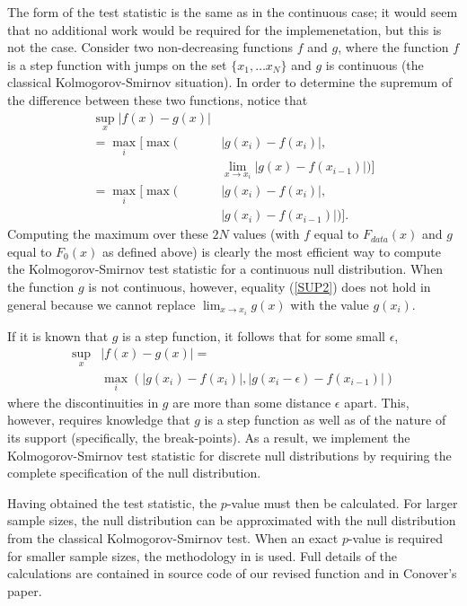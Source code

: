 The form of the test statistic is the same as in the
continuous case; it would seem that no additional work would be required
for the implemenetation, but this is not the case.
Consider two non-decreasing functions $f$ and $g$, where the function $f$ is a step function with jumps on the set $\{x_1, \ldots x_N \}$ and $g$
is continuous (the classical Kolmogorov-Smirnov situation).
In order to determine the supremum of the difference between
these two functions, notice that
\begin{align}
\sup_x \left| f(x) - g(x) \right| &  \nonumber  \\
       =  \max_i \bigg[ \max\bigg(  & \left|g(x_i) - f(x_i) \right|, \nonumber \\
& \lim_{x \rightarrow x_i} \left| g(x) - f(x_{i-1})
   \right| \bigg) \bigg] \label{SUP1}\\
=  \max_i \bigg[\max \bigg( & \left|g(x_i) - f(x_i) \right|, \nonumber \\
& \left| g(x_i) - f(x_{i-1}) \right| \bigg) \bigg]. \label{SUP2}
\end{align}
Computing the maximum over these $2N$
values (with $f$ equal to
$F_{data}(x)$ and $g$ equal to $F_0(x)$ as defined above) is clearly the 
most efficient way to compute the Kolmogorov-Smirnov test statistic for
a continuous null distribution. When the function $g$ is not
continuous, however, equality (\ref{SUP2}) does not hold in general because 
we cannot replace $\lim_{x\rightarrow x_i} g(x)$ with the value $g(x_i)$. 


If it is known that $g$ is a step function, it follows that
for some small $\epsilon$,
\begin{align}
\sup_x &\left| f(x)- g(x) \right| =  \nonumber \\
        & \max_i \left( \left|g(x_i) - f(x_i) \right|, 
    \left| g(x_i - \epsilon) - f(x_{i-1}) \right| \right) \label{epsilon}
\end{align}
where the discontinuities in $g$ are more than some distance $\epsilon$ apart. 
This, however, requires knowledge that $g$ is a step function as well as of
the nature of its support (specifically, the break-points).  As a result,
we implement the Kolmogorov-Smirnov test statistic for discrete null
distributions by requiring the complete specification of the null distribution.


Having obtained the test statistic, the $p$-value must then be calculated. 
For larger sample sizes, the null distribution can be approximated
with the null distribution from the classical Kolmogorov-Smirnov test. 
When an exact $p$-value is required for
smaller sample sizes, the methodology in \citet{Conover1972} is used. 
Full details of the calculations are contained in source code
of our revised function  and in Conover's paper. 


